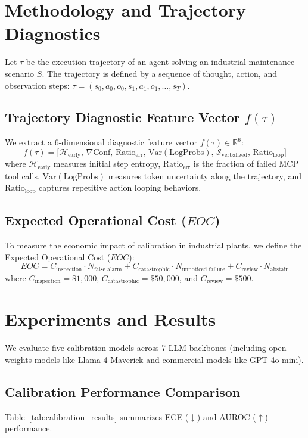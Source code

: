 \documentclass{article}
\begin{document}
\section{Methodology and Trajectory Diagnostics}
Let $\tau$ be the execution trajectory of an agent solving an industrial maintenance scenario $S$. The trajectory is defined by a sequence of thought, action, and observation steps: $\tau = (s_0, a_0, o_0, s_1, a_1, o_1, \dots, s_T)$.

\subsection{Trajectory Diagnostic Feature Vector $f(\tau)$}
We extract a 6-dimensional diagnostic feature vector $f(\tau) \in \mathbb{R}^6$:
\begin{equation}
f(\tau) = \big[ \mathcal{H}_{\text{early}}, \, \nabla\text{Conf}, \, \text{Ratio}_{\text{err}}, \, \text{Var}(\text{LogProbs}), \, \mathcal{S}_{\text{verbalized}}, \, \text{Ratio}_{\text{loop}} \big]
\end{equation}
where $\mathcal{H}_{\text{early}}$ measures initial step entropy, $\text{Ratio}_{\text{err}}$ is the fraction of failed MCP tool calls, $\text{Var}(\text{LogProbs})$ measures token uncertainty along the trajectory, and $\text{Ratio}_{\text{loop}}$ captures repetitive action looping behaviors.

\subsection{Expected Operational Cost ($EOC$)}
To measure the economic impact of calibration in industrial plants, we define the Expected Operational Cost ($EOC$):
\begin{equation}
EOC = C_{\text{inspection}} \cdot N_{\text{false\_alarm}} + C_{\text{catastrophic}} \cdot N_{\text{unnoticed\_failure}} + C_{\text{review}} \cdot N_{\text{abstain}}
\end{equation}
where $C_{\text{inspection}} = \$1,000$, $C_{\text{catastrophic}} = \$50,000$, and $C_{\text{review}} = \$500$.

\section{Experiments and Results}
We evaluate five calibration models across 7 LLM backbones (including open-weights models like Llama-4 Maverick and commercial models like GPT-4o-mini).

\subsection{Calibration Performance Comparison}
Table~\ref{tab:calibration_results} summarizes ECE ($\downarrow$) and AUROC ($\uparrow$) performance.
\end{document}
